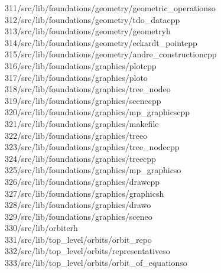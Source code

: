 \begin{tabbing}
311\>/src/lib/foundations/geometry/geometric\_operationso\\[0pt]
312\>/src/lib/foundations/geometry/tdo\_datacpp\\[0pt]
313\>/src/lib/foundations/geometry/geometryh\\[0pt]
314\>/src/lib/foundations/geometry/eckardt\_pointcpp\\[0pt]
315\>/src/lib/foundations/geometry/andre\_constructioncpp\\[0pt]
316\>/src/lib/foundations/graphics/plotcpp\\[0pt]
317\>/src/lib/foundations/graphics/ploto\\[0pt]
318\>/src/lib/foundations/graphics/tree\_nodeo\\[0pt]
319\>/src/lib/foundations/graphics/scenecpp\\[0pt]
320\>/src/lib/foundations/graphics/mp\_graphicscpp\\[0pt]
321\>/src/lib/foundations/graphics/makefile\\[0pt]
322\>/src/lib/foundations/graphics/treeo\\[0pt]
323\>/src/lib/foundations/graphics/tree\_nodecpp\\[0pt]
324\>/src/lib/foundations/graphics/treecpp\\[0pt]
325\>/src/lib/foundations/graphics/mp\_graphicso\\[0pt]
326\>/src/lib/foundations/graphics/drawcpp\\[0pt]
327\>/src/lib/foundations/graphics/graphicsh\\[0pt]
328\>/src/lib/foundations/graphics/drawo\\[0pt]
329\>/src/lib/foundations/graphics/sceneo\\[0pt]
330\>/src/lib/orbiterh\\[0pt]
331\>/src/lib/top\_level/orbits/orbit\_repo\\[0pt]
332\>/src/lib/top\_level/orbits/representativeso\\[0pt]
333\>/src/lib/top\_level/orbits/orbit\_of\_equationso\\[0pt]

\end{tabbing}
